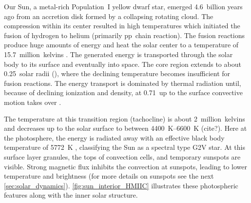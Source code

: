 Our Sun, a metal-rich Population~I yellow dwarf star, emerged 4.6~billion years ago \citep{Bahcall1995} from an accretion disk formed by a collapsing rotating cloud. The compression within its center resulted in high temperatures which initiated the fusion of hydrogen to helium (primarily pp~chain reaction). The fusion reactions produce huge amounts of energy and heat the solar center to a temperature of 15.7~million~kelvins \citep{Christensen-Dalsgaard1996}. The generated energy is transported through the solar body to its surface and eventually into space.
The core region extends to about 0.25~solar radii (\Rsun), where the declining temperature becomes insufficient for fusion reactions. The energy transport is dominated by thermal radiation until, because of declining ionization and density, at 0.71\,\Rsun{} up to the surface convective motion takes over \citep{Christensen-Dalsgaard1991}. %

The temperature at this transition region (tachocline) is about 2~million~kelvins and decreases up to the solar surface to between \SIrange{4400}{6600}{\K} (cite?). Here at the photosphere, the energy is radiated away with an effective black body temperature of \SI{5772}{\K} \citep{Mamajek2015}, classifying the Sun as a spectral type G2V star.
At this surface layer granules, the tops of convection cells, and temporary sunspots are visible. Strong magnetic flux inhibits the convection at sunspots, leading to lower temperature and brightness (for more details on sunspots see the next \autoref{sec:solar_dynamics}). \autoref{fig:sun_interior_HMIIC} illustrates these photospheric features along with the inner solar structure.\\
\begin{figure}[htb]
\end{figure}

